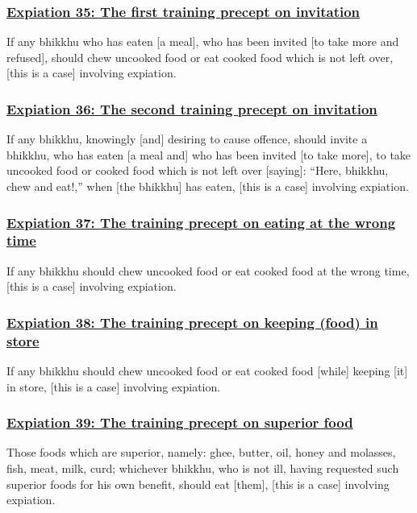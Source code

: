 \subsubsection*{\hyperref[pac35]{Expiation 35: The first training precept on invitation}}
\label{exp35}
If any bhikkhu who has eaten [a meal], who has been invited [to take more and refused], should chew uncooked food or eat cooked food which is not left over, [this is a case] involving expiation.

\subsubsection*{\hyperref[pac36]{Expiation 36: The second training precept on invitation}}
\label{exp36}
If any bhikkhu, knowingly [and] desiring to cause offence, should invite a bhikkhu, who has eaten [a meal and] who has been invited [to take more], to take uncooked food or cooked food which is not left over [saying]: ``Here, bhikkhu, chew and eat!,'' when [the bhikkhu] has eaten, [this is a case] involving expiation.

\subsubsection*{\hyperref[pac37]{Expiation 37: The training precept on eating at the wrong time}}
\label{exp37}
If any bhikkhu should chew uncooked food or eat cooked food at the wrong time, [this is a case] involving expiation.

\subsubsection*{\hyperref[pac38]{Expiation 38: The training precept on keeping (food) in store}}
\label{exp38}
If any bhikkhu should chew uncooked food or eat cooked food [while] keeping [it] in store, [this is a case] involving expiation.

\subsubsection*{\hyperref[pac39]{Expiation 39: The training precept on superior food}}
\label{exp39}
Those foods which are superior, namely: ghee, butter, oil, honey and molasses, fish, meat, milk, curd; whichever bhikkhu, who is not ill, having requested such superior foods for his own benefit, should eat [them], [this is a case] involving expiation.

